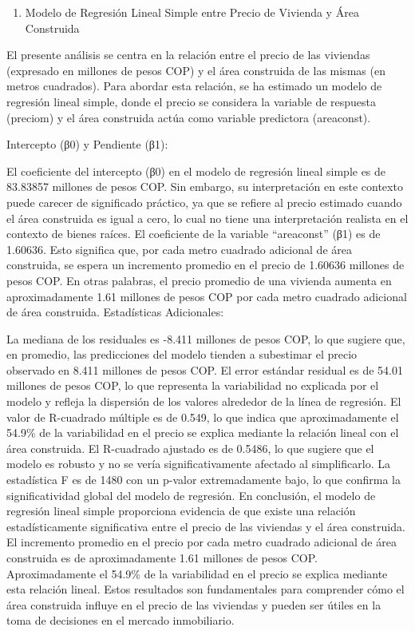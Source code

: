\documentclass[
]{article}
\providecommand{\tightlist}{%
  \setlength{\itemsep}{0pt}\setlength{\parskip}{0pt}}
\begin{document}
\begin{enumerate}
\def\labelenumi{\arabic{enumi}.}
\setcounter{enumi}{3}
\tightlist
\item
  Modelo de Regresión Lineal Simple entre Precio de Vivienda y Área
  Construida
\end{enumerate}

El presente análisis se centra en la relación entre el precio de las
viviendas (expresado en millones de pesos COP) y el área construida de
las mismas (en metros cuadrados). Para abordar esta relación, se ha
estimado un modelo de regresión lineal simple, donde el precio se
considera la variable de respuesta (preciom) y el área construida actúa
como variable predictora (areaconst).

Intercepto (β0) y Pendiente (β1):

El coeficiente del intercepto (β0) en el modelo de regresión lineal
simple es de 83.83857 millones de pesos COP. Sin embargo, su
interpretación en este contexto puede carecer de significado práctico,
ya que se refiere al precio estimado cuando el área construida es igual
a cero, lo cual no tiene una interpretación realista en el contexto de
bienes raíces. El coeficiente de la variable ``areaconst'' (β1) es de
1.60636. Esto significa que, por cada metro cuadrado adicional de área
construida, se espera un incremento promedio en el precio de 1.60636
millones de pesos COP. En otras palabras, el precio promedio de una
vivienda aumenta en aproximadamente 1.61 millones de pesos COP por cada
metro cuadrado adicional de área construida. Estadísticas Adicionales:

La mediana de los residuales es -8.411 millones de pesos COP, lo que
sugiere que, en promedio, las predicciones del modelo tienden a
subestimar el precio observado en 8.411 millones de pesos COP. El error
estándar residual es de 54.01 millones de pesos COP, lo que representa
la variabilidad no explicada por el modelo y refleja la dispersión de
los valores alrededor de la línea de regresión. El valor de R-cuadrado
múltiple es de 0.549, lo que indica que aproximadamente el 54.9\% de la
variabilidad en el precio se explica mediante la relación lineal con el
área construida. El R-cuadrado ajustado es de 0.5486, lo que sugiere que
el modelo es robusto y no se vería significativamente afectado al
simplificarlo. La estadística F es de 1480 con un p-valor extremadamente
bajo, lo que confirma la significatividad global del modelo de
regresión. En conclusión, el modelo de regresión lineal simple
proporciona evidencia de que existe una relación estadísticamente
significativa entre el precio de las viviendas y el área construida. El
incremento promedio en el precio por cada metro cuadrado adicional de
área construida es de aproximadamente 1.61 millones de pesos COP.
Aproximadamente el 54.9\% de la variabilidad en el precio se explica
mediante esta relación lineal. Estos resultados son fundamentales para
comprender cómo el área construida influye en el precio de las viviendas
y pueden ser útiles en la toma de decisiones en el mercado inmobiliario.
\end{document}
